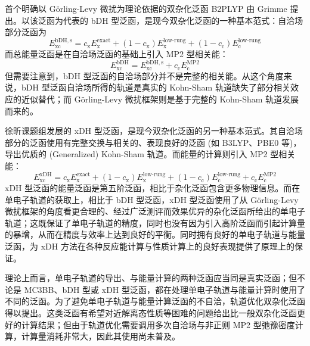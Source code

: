 首个明确以 G\"{o}rling-Levy 微扰为理论依据的双杂化泛函 B2PLYP 由 Grimme 提出\cite{Grimme-Grimme.JCP.2006}。以该泛函为代表的 bDH 型泛函，是现今双杂化泛函的一种基本范式：自洽场部分泛函为
\begin{equation}
  E_\mathrm{xc}^\mathrm{bDH, s} = c_\mathrm{x} E_\mathrm{x}^\mathrm{exact} + (1 - c_\mathrm{x}) E_\mathrm{x}^\text{low-rung} + (1 - c_\mathrm{c}) E_\mathrm{c}^\text{low-rung}
\end{equation}
而总能量泛函是在自洽场泛函的基础上引入 MP2 型相关能：
\begin{equation}
  E_\mathrm{xc}^\mathrm{bDH} = E_\mathrm{xc}^\mathrm{bDH, s} + c_\mathrm{c} E_\mathrm{c}^\mathrm{MP2}
\end{equation}
但需要注意到，bDH 型泛函的自洽场部分并不是完整的相关能。从这个角度来说，bDH 型泛函自洽场所得的轨道是真实的 Kohn-Sham 轨道缺失了部分相关效应的近似替代；而 G\"{o}rling-Levy 微扰框架则是基于完整的 Kohn-Sham 轨道发展而来的。

徐昕课题组发展的 xDH 型泛函，是现今双杂化泛函的另一种基本范式。其自洽场部分的泛函使用有完整交换与相关的、表现良好的泛函 (如 B3LYP、PBE0 等)，导出优质的 (Generalized) Kohn-Sham 轨道。而能量的计算则引入 MP2 型相关能：
\begin{equation}
  E_\mathrm{xc}^\mathrm{xDH} = c_\mathrm{x} E_\mathrm{x}^\mathrm{exact} + (1 - c_\mathrm{x}) E_\mathrm{x}^\text{low-rung} + (1 - c_\mathrm{c}) E_\mathrm{c}^\text{low-rung} + c_\mathrm{c} E_\mathrm{c}^\mathrm{MP2}
\end{equation}
xDH 型泛函的能量泛函是第五阶泛函，相比于杂化泛函包含更多物理信息。而在单电子轨道的获取上，相比于 bDH 型泛函，xDH 型泛函使用了从 G\"{o}rling-Levy 微扰框架的角度看更合理的、经过广泛测评而效果优异的杂化泛函所给出的单电子轨道；这既保证了单电子轨道的精度，同时也没有因为引入高阶泛函而引起计算量的暴增，从而在精度与效率上达到良好的平衡。同时拥有良好的单电子轨道与能量泛函，为 xDH 方法在各种反应能计算与性质计算上的良好表现提供了原理上的保证。

理论上而言，单电子轨道的导出、与能量计算的两种泛函应当同是真实泛函；但不论是 MC3BB、bDH 型或 xDH 型泛函，都在处理单电子轨道与能量计算时使用了不同的泛函。为了避免单电子轨道与能量计算泛函的不自洽，轨道优化双杂化泛函得以提出\cite{Hait-Head-Gordon.JCP.2018}。这类泛函有希望对近解离态性质等困难的问题给出比一般双杂化泛函更好的计算结果；但由于轨道优化需要调用多次自洽场与非正则 MP2 型弛豫密度计算，计算量消耗非常大，因此其使用尚未普及。

